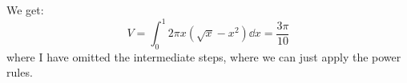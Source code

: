\begin{itemize}
\begin{example}
        We get:
        \begin{equation}
            V = \int_0^1 2\pi x (\sqrt{x}-x^2) \dd{x} = \frac{3\pi}{10}
            \label{eq:}
        \end{equation}
        where I have omitted the intermediate steps, where we can just apply the power rules.
    \end{example}
\end{itemize}